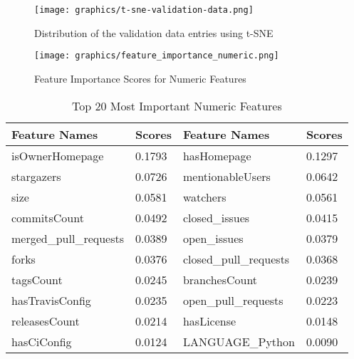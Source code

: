 \begin{figure}
	\centering
		\texttt{[image: graphics/t-sne-validation-data.png]}
	\caption{Distribution of the validation data entries using t-SNE}
	\label{t-sne-validation-data}
\end{figure}


\begin{figure}
	\centering
		\texttt{[image: graphics/feature\_importance\_numeric.png]}
	\caption{Feature Importance Scores for Numeric Features}
	\label{feature_importance_numeric_graphic}
\end{figure}

\begin{table}[h]
\centering
\caption{Top 20 Most Important Numeric Features}
\label{feature_importance_numeric}
\begin{tabular}{|l|l|l|l|}
 \hline
Feature Names & Scores & Feature Names & Scores \\ \hline
isOwnerHomepage  &   0.1793 & hasHomepage & 0.1297 \\ \hline
stargazers  &   0.0726 & mentionableUsers & 0.0642 \\ \hline
size  &   0.0581 & watchers & 0.0561 \\ \hline
commitsCount  &   0.0492 & closed\_issues & 0.0415 \\ \hline
merged\_pull\_requests  &   0.0389 & open\_issues & 0.0379 \\ \hline
forks  &   0.0376 & closed\_pull\_requests & 0.0368 \\ \hline
tagsCount  &   0.0245 & branchesCount & 0.0239 \\ \hline
hasTravisConfig  &   0.0235 & open\_pull\_requests & 0.0223 \\ \hline
releasesCount  &   0.0214 & hasLicense & 0.0148 \\ \hline
hasCiConfig  &   0.0124 & LANGUAGE\_Python & 0.0090 \\ \hline
\end{tabular}
\end{table}


